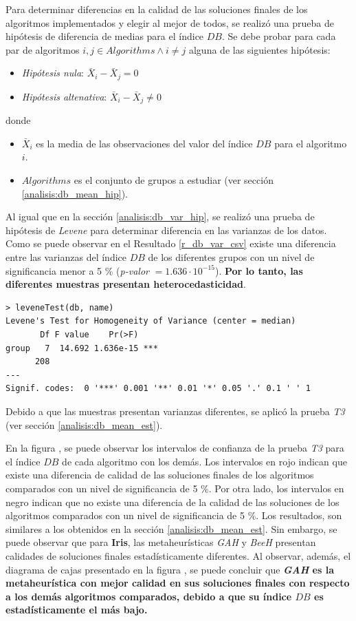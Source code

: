     Para determinar diferencias en la calidad de las soluciones finales de los
algoritmos implementados y elegir al mejor de todos, se realizó una prueba de
hipótesis de diferencia de medias para el índice $DB$. Se debe probar para
cada par de algoritmos $i, j \in Algorithms \land i \neq j$ alguna de las
siguientes hipótesis:
\begin{itemize}
    \item \emph{Hipótesis nula}: $\bar{X}_i - \bar{X}_j = 0$
    \item \emph{Hipótesis altenativa}: $\bar{X}_i - \bar{X}_j \neq 0$
\end{itemize}
donde
\begin{itemize}
    \item $\bar{X}_i$ es la media de las observaciones del valor del índice $DB$
          para el algoritmo $i$.
    \item $Algorithms$ es el conjunto de grupos a estudiar (ver sección
          \ref{analisis:db_mean_hip}).
\end{itemize}

    Al igual que en la sección \ref{analisis:db_var_hip}, se realizó una prueba
de hipótesis de \emph{Levene} para determinar diferencia en las varianzas de los
datos. Como se puede observar en el Resultado \ref{r_db_var_csv} existe una diferencia
entre las varianzas del índice $DB$ de los diferentes grupos con un nivel de
significancia menor a 5 \% (\emph{p-valor} $ = 1.636 \cdot 10^{-15}$). \textbf{Por lo tanto,
las diferentes muestras presentan heterocedasticidad}.

\begin{lstlisting}[float=h!, caption={Diferencia de Varianza: Índice \emph{DB}}, label=r_db_var_csv]
> leveneTest(db, name)
Levene's Test for Homogeneity of Variance (center = median)
       Df F value    Pr(>F)    
group   7  14.692 1.636e-15 ***
      208                      
---
Signif. codes:  0 '***' 0.001 '**' 0.01 '*' 0.05 '.' 0.1 ' ' 1
\end{lstlisting}

    Debido a que las muestras presentan varianzas diferentes, se aplicó la prueba
\emph{T3} (ver sección \ref{analisis:db_mean_est}).

    En la figura , se puede observar los intervalos de
confianza de la prueba \emph{T3} para el índice $DB$ de cada algoritmo con los
demás. Los intervalos en rojo indican que existe una diferencia de calidad de las
soluciones finales de los algoritmos comparados con un nivel de significancia de
5 \%. Por otra lado, los intervalos en negro indican que no existe una diferencia
de la calidad de las soluciones de los algoritmos comparados con un nivel de 
significancia de 5 \%. Los resultados, son similares a los obtenidos en la
sección \ref{analisis:db_mean_est}. Sin embargo, se puede observar que para
\textbf{Iris}, las metaheurísticas \emph{GAH} y \emph{BeeH} presentan calidades
de soluciones finales estadísticamente diferentes. Al observar, además, el
diagrama de cajas presentado en la figura , se puede
concluir que \textbf{\emph{GAH} es la metaheurística con mejor calidad en sus
soluciones finales con respecto a los demás algoritmos comparados, debido a que
su índice $DB$ es estadísticamente el más bajo.}

